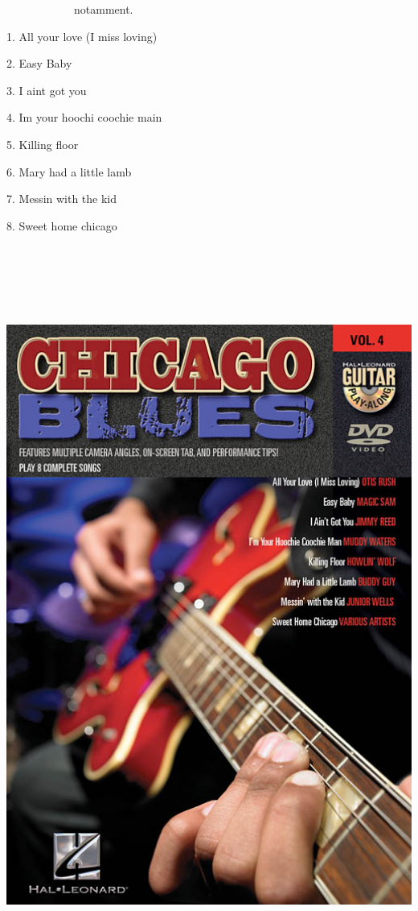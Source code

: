 \documentclass[a4paper]{book}
\begin{document}
\ \ \ \ \ \ \ \ \ \ \ \ notamment.

1. All your love (I miss loving)

2. Easy Baby

3. I ain{\textquotesingle}t got you

4. I{\textquotesingle}m your hoochi coochie main

5. Killing floor

6. Mary had a little lamb

7. Messin{\textquotesingle} with the kid

8. Sweet home chicago






\begin{center}
\includegraphics[width=17cm,height=24.276cm]{lebluessupportsmethodes-img63.jpg}
\end{center}
\end{document}
